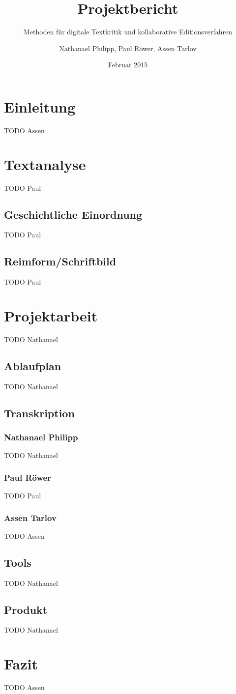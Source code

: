\documentclass[a4paper, 12pt, oneside]{scrbook}
\author{Nathanael Philipp, Paul Röwer, Assen Tarlov}
\title{Projektbericht}
\subtitle{Methoden für digitale Textkritik und kollaborative Editionsverfahren}
\date{Februar 2015}
\begin{document}
\maketitle\newpage
\tableofcontents\newpage
\chapter{Einleitung}
TODO Assen

\chapter{Textanalyse}
TODO Paul
\section{Geschichtliche Einordnung}
TODO Paul
\section{Reimform/Schriftbild}
TODO Paul

\chapter{Projektarbeit}
TODO Nathanael
\section{Ablaufplan}
TODO Nathanael

\section{Transkription}
\subsection{Nathanael Philipp}
TODO Nathanael
\subsection{Paul Röwer}
TODO Paul
\subsection{Assen Tarlov}
TODO Assen
\section{Tools}
TODO Nathanael
\section{Produkt}
TODO Nathanael

\chapter{Fazit}
TODO Assen

\printbibliography
\end{document}
